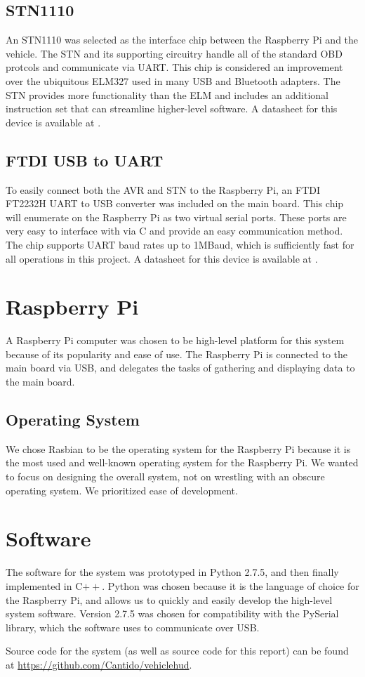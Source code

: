 \subsection{STN1110}
An STN1110 was selected as the interface chip between the Raspberry Pi and the 
vehicle.  The STN and its supporting circuitry handle all of the standard OBD
protcols and communicate via UART.  This chip is considered an improvement over
the ubiquitous ELM327 used in many USB and Bluetooth adapters.  The STN provides
more functionality than the ELM and includes an additional instruction set that
can streamline higher-level software. A datasheet for this device is available
at \cite{stn1110ds}.

\subsection{FTDI USB to UART}
To easily connect both the AVR and STN to the Raspberry Pi, an FTDI FT2232H UART 
to USB converter was included on the main board.  This chip will enumerate on the
Raspberry Pi as two virtual serial ports.  These ports are very easy to interface
with via C and provide an easy communication method.  The chip supports UART baud
rates up to 1MBaud, which is sufficiently fast for all operations in this project.
A datasheet for this device is available at \cite{ft2232hds}.

\section{Raspberry Pi}

A Raspberry Pi computer was chosen to be high-level platform for this system
because of its popularity and ease of use. The Raspberry Pi is connected to the
main board via USB, and delegates the tasks of gathering and displaying data
to the main board.

\subsection{Operating System}
We chose Rasbian to be the operating system for the Raspberry Pi because it is the
most used and well-known operating system for the Raspberry Pi. We wanted to focus
on designing the overall
system, not on wrestling with an obscure operating system. We prioritized ease
of development.

\section{Software}
The software for the system was prototyped in Python 2.7.5, and then finally
implemented in C$++$. Python was chosen
because it is the language of choice for the Raspberry Pi, and allows us to
quickly and easily develop the high-level system software. Version 2.7.5 was
chosen for compatibility with the PySerial library, which the software uses to
communicate over USB.

Source code for the system (as well as source code for this report) can be
found at \url{https://github.com/Cantido/vehiclehud}.
